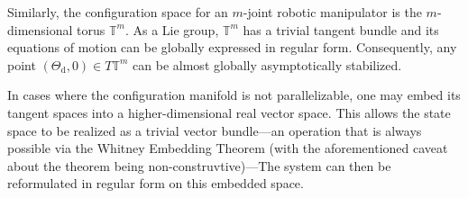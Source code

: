 \documentclass{article}
\theoremstyle{definition}
\theoremstyle{remark}
\newcommand{\rd}{\mathrm{d}}	%
\begin{document}
Similarly, the configuration space for an $m$-joint robotic manipulator is the $m$-dimensional torus $\mathbb{T}^m$. As a 
Lie group, $\mathbb{T}^m$ has a trivial tangent bundle and its equations of motion can be globally expressed in regular form.
Consequently, any point $(\Theta_\rd,0) \in T\mathbb{T}^m$ can be almost globally asymptotically stabilized.

In cases where the configuration manifold is not parallelizable, one may embed its tangent spaces into a higher-dimensional
real vector space. This allows the state space to be realized as a trivial vector bundle---an operation that is always possible
via the Whitney Embedding Theorem (with the aforementioned caveat about the theorem being non-construvtive)---The
system can then be reformulated in regular form on this embedded space.
\end{document}
